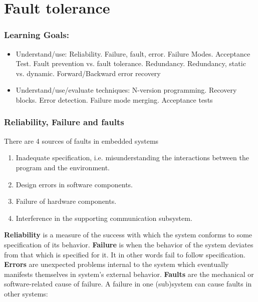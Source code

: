 \part{Fault tolerance}
\section{Learning Goals:}
\begin{itemize}
    \item Understand/use: Reliability. Failure, fault, error. Failure Modes. Acceptance Test. Fault prevention vs. fault tolerance. Redundancy. Redundancy, static vs. dynamic. Forward/Backward error recovery
    \item Understand/use/evaluate techniques: N-version programming. Recovery blocks. Error detection. Failure mode merging. Acceptance tests 
\end{itemize}

\section{Reliability, Failure and faults}
There are 4 sources of faults in embedded systems
\begin{enumerate}
    \item Inadequate specification, i.e. misunderstanding the interactions between the program and the environment.
    \item Design errors in software components.
    \item Failure of hardware components. 
    \item Interference in the supporting communication subsystem.
\end{enumerate}

\textbf{Reliability} is a measure of the success with which the system conforms to some specification of its behavior. \textbf{Failure} is when the behavior of the system deviates from that which is specified for it. It in other words fail to follow specification. \textbf{Errors} are unexpected problems internal to the system which eventually manifests themselves in system's external behavior. \textbf{Faults} are the mechanical or software-related cause of failure. A failure in one (sub)system can cause faults in other systems:

